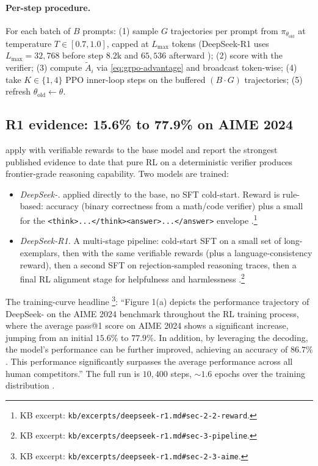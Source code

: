 \paragraph{Per-step procedure.} For each batch of $B$ prompts: (1)
sample $G$ trajectories per prompt from $\pi_{\theta_{\mathrm{old}}}$ at
temperature $T \in [0.7, 1.0]$, capped at $L_{\max}$ tokens (DeepSeek-R1
uses $L_{\max} = 32{,}768$ before step $8.2$k and $65{,}536$
afterward \citep[\S 2.1]{deepseek-r1}); (2) score with the verifier;
(3) compute $\tilde{A}_i$ via \cref{eq:grpo-advantage} and broadcast
token-wise; (4) take $K \in \{1, 4\}$ PPO inner-loop steps on the
buffered $(B \cdot G)$ trajectories; (5) refresh
$\theta_{\mathrm{old}} \leftarrow \theta$.

\subsection{R1 evidence: 15.6\% to 77.9\% on AIME 2024}
\label{sec:rlvr-r1}

\citet{deepseek-r1} apply  with verifiable rewards to the
 base model and report the strongest published evidence to
date that pure RL on a deterministic verifier produces frontier-grade
reasoning capability. Two models are trained:

\begin{itemize}
\item \emph{DeepSeek-.}  applied directly to the base, no SFT
cold-start. Reward is rule-based: accuracy (binary correctness from a
math/code verifier) plus a small  for the
\texttt{<think>...</think><answer>...</answer>} envelope
\citep[\S 2.2]{deepseek-r1}.\footnote{KB excerpt:
\texttt{kb/excerpts/deepseek-r1.md\#sec-2-2-reward}.}
\item \emph{DeepSeek-R1.} A multi-stage pipeline: cold-start SFT on a
small set of long- exemplars, then  with the same verifiable
rewards (plus a language-consistency reward), then a second SFT on
rejection-sampled reasoning traces, then a final RL alignment stage for
helpfulness and harmlessness \citep[\S 3]{deepseek-r1}.\footnote{KB
excerpt: \texttt{kb/excerpts/deepseek-r1.md\#sec-3-pipeline}.}
\end{itemize}

The training-curve headline \citep[\S 2.3]{deepseek-r1}\footnote{KB
excerpt: \texttt{kb/excerpts/deepseek-r1.md\#sec-2-3-aime}.}: ``Figure
1(a) depicts the performance trajectory of DeepSeek- on the AIME
2024 benchmark throughout the RL training process, where the average
pass@1 score on AIME 2024 shows a significant increase, jumping from an
initial $15.6\%$ to $77.9\%$. In addition, by leveraging the
 decoding, the model's performance can be further
improved, achieving an accuracy of $86.7\%$. This performance
significantly surpasses the average performance across all human
competitors.'' The full run is $10{,}400$ steps,
$\sim\!1.6$ epochs over the training distribution
\citep[\S 2.1]{deepseek-r1}.

